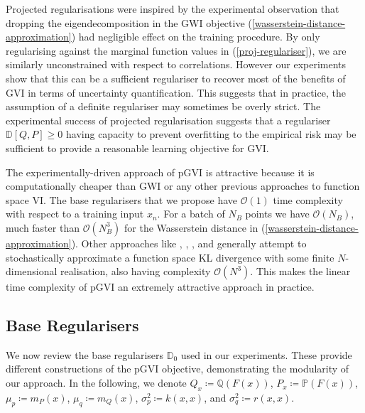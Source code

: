 \documentclass{article}
\newcommand{\vw}[1]{{\color{green} [VW: #1]}}
\numberwithin{equation}{section}
\begin{document}
Projected regularisations were inspired by the experimental observation that dropping the eigendecomposition in the GWI objective (\ref{wasserstein-distance-approximation}) had negligible effect on the training procedure.
By only regularising against the marginal function values in (\ref{proj-regulariser}), we are similarly unconstrained with respect to correlations.
However our experiments show that this can be a sufficient regulariser to recover most of the benefits of GVI in terms of uncertainty quantification. 
This suggests that in practice, the assumption of a definite regulariser may sometimes be overly strict.
The experimental success of projected regularisation suggests that a regulariser $\mathbb{D}[Q, P] \geq 0$ having capacity to prevent overfitting to the empirical risk may be sufficient to provide a reasonable learning objective for GVI.


The experimentally-driven approach of pGVI is attractive because it is computationally cheaper than GWI or any other previous approaches to function space VI.
The base regularisers that we propose have $\mathcal{O}(1)$ time complexity  with respect to a training input $x_n$.
For a batch of $N_B$ points we have $\mathcal{O}(N_B)$, much faster than $\mathcal{O}(N_B^3)$ for the Wasserstein distance in (\ref{wasserstein-distance-approximation}).  
Other approaches like \cite{rudner2020rethinking}, \cite{sun2019functional}, \cite{ma2019variational}, and \cite{ma2021functional} generally attempt to stochastically approximate a function space KL divergence with some finite $N$-dimensional realisation, also having complexity $\mathcal{O}(N^3)$. 
This makes the linear time complexity of pGVI an extremely attractive approach in practice.

\subsection{Base Regularisers}
We now review the base regularisers $\mathbb{D}_0$ used in our experiments. 
These provide different constructions of the pGVI objective, demonstrating the modularity of our approach.
In the following, we denote $Q_{x} \coloneqq \mathbb{Q}\left(F(x)\right)$, $P_{x} \coloneqq \mathbb{P}\left(F(x)\right)$, $\mu_p \coloneqq m_P(x)$, $\mu_q \coloneqq m_Q(x)$, $\sigma_p^2 \coloneqq k(x, x)$, and $\sigma_q^2 \coloneqq r(x, x)$.
\end{document}
